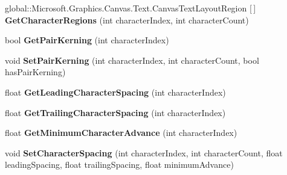 \begin{DoxyCompactItemize}
global\+::\+Microsoft.\+Graphics.\+Canvas.\+Text.\+Canvas\+Text\+Layout\+Region \mbox{[}$\,$\mbox{]} {\bfseries Get\+Character\+Regions} (int character\+Index, int character\+Count)
\item 
\mbox{\label{interface_microsoft_1_1_graphics_1_1_canvas_1_1_text_1_1_i_canvas_text_layout_aad1825e0663c1f7846a93a175cf888e5}} 
bool {\bfseries Get\+Pair\+Kerning} (int character\+Index)
\item 
\mbox{\label{interface_microsoft_1_1_graphics_1_1_canvas_1_1_text_1_1_i_canvas_text_layout_a20aaafcf4e028122cfc8726b8fbc1f5b}} 
void {\bfseries Set\+Pair\+Kerning} (int character\+Index, int character\+Count, bool has\+Pair\+Kerning)
\item 
\mbox{\label{interface_microsoft_1_1_graphics_1_1_canvas_1_1_text_1_1_i_canvas_text_layout_addf54ecd9d5f689e2f22514aabe8c42e}} 
float {\bfseries Get\+Leading\+Character\+Spacing} (int character\+Index)
\item 
\mbox{\label{interface_microsoft_1_1_graphics_1_1_canvas_1_1_text_1_1_i_canvas_text_layout_a199bf5969708e06675546b0d7f97c609}} 
float {\bfseries Get\+Trailing\+Character\+Spacing} (int character\+Index)
\item 
\mbox{\label{interface_microsoft_1_1_graphics_1_1_canvas_1_1_text_1_1_i_canvas_text_layout_a9b50d894550f524f46294a3b5e626497}} 
float {\bfseries Get\+Minimum\+Character\+Advance} (int character\+Index)
\item 
\mbox{\label{interface_microsoft_1_1_graphics_1_1_canvas_1_1_text_1_1_i_canvas_text_layout_a4fe84383740a7e700a50355516d1638a}} 
void {\bfseries Set\+Character\+Spacing} (int character\+Index, int character\+Count, float leading\+Spacing, float trailing\+Spacing, float minimum\+Advance)
\item 
\mbox{\label{interface_microsoft_1_1_graphics_1_1_canvas_1_1_text_1_1_i_canvas_text_layout_a16ecbf654a23cfb935ad2339f832336b}} 

\end{DoxyCompactItemize}
